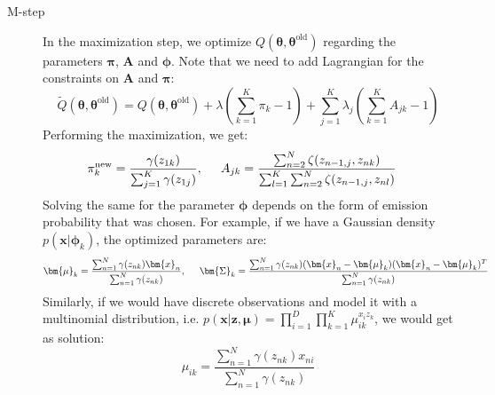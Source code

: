 \begin{itemize}
\begin{description}
		\item[M-step] In the maximization step, we optimize $Q(\bm{\theta}, \bm{\theta}^{\text{old}})$ regarding the parameters $\bm{\pi}$, $\bm{A}$ and $\bm{\phi}$. Note that we need to add Lagrangian for the constraints on $\bm{A}$ and $\bm{\pi}$:
		$$\tilde{Q}(\bm{\theta}, \bm{\theta}^{\text{old}}) = Q(\bm{\theta}, \bm{\theta}^{\text{old}}) + \lambda \left(\sum_{k=1}^{K} \pi_k - 1\right) + \sum_{j=1}^{K} \lambda_j \left(\sum_{k=1}^{K} A_{jk} - 1\right)$$
		Performing the maximization, we get:
		\begin{equation*}
			\begin{split}
				\pi_k^{\text{new}} & =\frac{\gamma(z_{1k})}{\sum_{j=1}^{K}\gamma(z_{1j})}, \hspace{5mm} A_{jk} = \frac{\sum_{n=2}^{N} \zeta(z_{n-1,j}, z_{nk})}{\sum_{l=1}^{K}\sum_{n=2}^{N} \zeta(z_{n-1,j}, z_{nl})}
			\end{split}
		\end{equation*}
		Solving the same for the parameter $\bm{\phi}$ depends on the form of emission probability that was chosen. For example, if we have a Gaussian density $p(\bm{x}|\bm{\phi}_k)$, the optimized parameters are:
		$$\bm{\mu}_k=\frac{\sum_{n=1}^{N}\gamma(z_{nk})\bm{x}_n}{\sum_{n=1}^{N}\gamma(z_{nk})}, \hspace{5mm} \bm{\Sigma}_k = \frac{\sum_{n=1}^{N} \gamma(z_{nk})(\bm{x}_n - \bm{\mu}_{k})(\bm{x}_n - \bm{\mu}_{k})^T}{\sum_{n=1}^{N} \gamma(z_{nk})}$$
		Similarly, if we would have discrete observations and model it with a multinomial distribution, i.e. $p(\bm{x}|\bm{z},\bm{\mu}) = \prod_{i=1}^{D}\prod_{k=1}^{K} \mu_{ik}^{x_i z_k}$, we would get as solution:
		$$\mu_{ik} = \frac{\sum_{n=1}^{N}\gamma(z_{nk})x_{ni}}{\sum_{n=1}^{N}\gamma(z_{nk})}$$
	\end{description}
	

\end{itemize}
